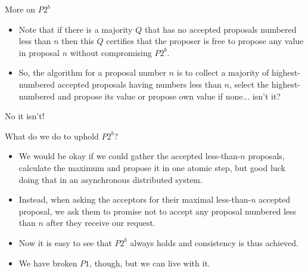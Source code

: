\documentclass{beamer}
\begin{document}
\begin{frame}{More on $P2^b$}
  \begin{itemize}
    \item Note that if there is a majority $Q$ that has \alert{no} accepted proposals numbered less than $n$ then this $Q$ certifies that the proposer is free to propose any value in proposal $n$ without compromising $P2^b$.
    \item So, the algorithm for a proposal number $n$ is to collect a majority of highest-numbered accepted proposals having numbers less than $n$, select the highest-numbered and propose its value or propose own value if none... isn't it?
  \end{itemize}
\end{frame}

\begin{frame}{No it isn't!}
  \begin{figure}[!h]
  \centering
  \end{figure}
\end{frame}

\begin{frame}{What do we do to uphold $P2^b$?}
  \begin{itemize}
    \item We would be okay if we could gather the accepted less-than-$n$ proposals, calculate the maximum and propose it in one atomic step, but good luck doing that in an asynchronous distributed system.
    \item Instead, when asking the acceptors for their maximal less-than-$n$ accepted proposal, we ask them to \alert{promise} not to accept any proposal numbered less than $n$ after they receive our request.
    \item Now it is easy to see that $P2^b$ always holds and consistency is thus achieved.
    \item We have broken $P1$, though, but we can live with it.
  \end{itemize}
\end{frame}
\end{document}
